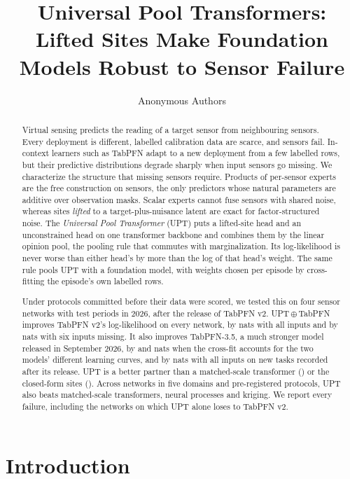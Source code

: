 \documentclass{article}
\title{Universal Pool Transformers:\\Lifted Sites Make Foundation Models Robust to Sensor Failure}
\author{Anonymous Authors}
\begin{document}
\maketitle

\begin{abstract}
Virtual sensing predicts the reading of a target sensor from neighbouring sensors. Every deployment is different,
labelled calibration data are scarce, and sensors fail. In-context learners such as TabPFN adapt to a new deployment
from a few labelled rows, but their predictive distributions degrade sharply when input sensors go missing. We
characterize the structure that missing sensors require. Products of per-sensor experts are the free construction on
sensors, the only predictors whose natural parameters are additive over observation masks. Scalar experts cannot
fuse sensors with shared noise, whereas sites \emph{lifted} to a target-plus-nuisance latent are exact for
factor-structured noise. The \emph{Universal Pool Transformer} (UPT) puts a lifted-site head and an unconstrained
head on one transformer backbone and combines them by the linear opinion pool, the pooling rule that commutes with
marginalization. Its log-likelihood is never worse than either head's by more than the log of that head's weight. The
same rule pools UPT with a foundation model, with weights chosen per episode by cross-fitting the episode's own
labelled rows.

Under protocols committed before their data were scored, we tested this on four sensor networks with test periods
in 2026, after the release of TabPFN v2. UPT\,$\oplus$\,TabPFN improves TabPFN v2's
log-likelihood on every network, by \XOne{} nats with all inputs and by \XTwoSix{} nats with six inputs missing.
It also improves TabPFN-3.5, a much stronger model released in September 2026, by \VOne{} and \VTwoSix{} nats when
the cross-fit accounts for the two models' different learning curves, and by \GOne{} nats with all inputs on
\GEpisodes{} new tasks recorded after its release.
UPT is a better partner than a matched-scale transformer (\YOneZero{}) or the closed-form sites (\YTwoZero{}). Across
\NumNetworks{} networks in five domains and \NumProtocols{} pre-registered protocols, UPT also beats matched-scale
transformers, neural processes and kriging. We report every failure, including the networks on which UPT alone loses
to TabPFN v2.
\end{abstract}

\section{Introduction}
\end{document}
